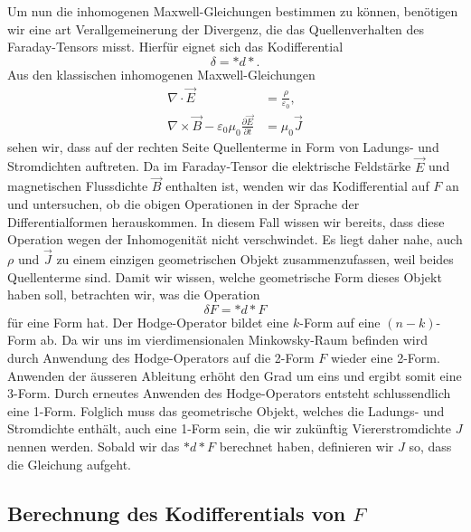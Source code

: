 Um nun die inhomogenen Maxwell-Gleichungen bestimmen zu können, benötigen wir eine art Verallgemeinerung der Divergenz, die das Quellenverhalten des Faraday-Tensors misst. Hierfür eignet sich das Kodifferential
\begin{equation*}
	\delta = \ast d {\ast}.
\end{equation*}
Aus den klassischen inhomogenen Maxwell-Gleichungen
\begin{align}
	\nabla \cdot \vec{E} &= \frac{\rho}{\varepsilon_0},\\
	\nabla \times \vec{B} - \varepsilon_0 \mu_0 \frac{\partial \vec{E}}{\partial t}&= \mu_0 \vec{J}
\end{align}
sehen wir, dass auf der rechten Seite Quellenterme in Form von Ladungs- und Stromdichten auftreten.
Da im Faraday-Tensor die elektrische Feldstärke $\vec{E}$ und magnetischen Flussdichte $\vec{B}$ enthalten ist, wenden wir das Kodifferential auf $F$ an und untersuchen, ob die obigen Operationen in der Sprache der Differentialformen herauskommen.
In diesem Fall wissen wir bereits, dass diese Operation wegen der Inhomogenität nicht verschwindet.
Es liegt daher nahe, auch $\rho$ und $\vec{J}$ zu einem einzigen geometrischen Objekt zusammenzufassen, weil beides Quellenterme sind.
Damit wir wissen, welche geometrische Form dieses Objekt haben soll, betrachten wir, was die Operation 
\begin{equation*}
	\delta F = \ast d{\ast} F
\end{equation*}
für eine Form hat.
Der Hodge-Operator bildet eine $k$-Form auf eine $(n-k)$-Form ab.
Da wir uns im vierdimensionalen Minkowsky-Raum befinden wird durch Anwendung des Hodge-Operators auf die 2-Form $F$ wieder eine 2-Form.
Anwenden der äusseren Ableitung erhöht den Grad um eins und ergibt somit eine 3-Form.
Durch erneutes Anwenden des Hodge-Operators entsteht schlussendlich eine 1-Form.
Folglich muss das geometrische Objekt, welches die Ladungs- und Stromdichte enthält, auch eine 1-Form sein, die wir zukünftig Viererstromdichte $J$ nennen werden.
Sobald wir das $\ast d {\ast} F$ berechnet haben, definieren wir $J$ so, dass die Gleichung aufgeht.

\subsection{Berechnung des Kodifferentials von $F$}

